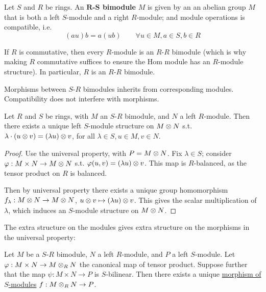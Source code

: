 \begin{definition}[Bimodule]
    Let $S$ and $R$ be rings. An \textbf{$\mathbf{R}$-$\mathbf{S}$ bimodule} $M$ is given by an an abelian group $M$ that is both a left $S$-module and a right $R$-module; and module operations is compatible, i.e.
    \[
        (au)b = a(ub) \qquad \forall u \in M, a \in S, b \in R
    \]
\end{definition}

\begin{remark}
    If $R$ is commutative, then every $R$-module is an $R$-$R$ bimodule (which is why making $R$ commutative suffices to ensure the Hom module has an $R$-module structure). In particular, $R$ is an $R$-$R$ bimodule.
\end{remark}

\begin{remark}
    Morphisms between $S$-$R$ bimodules inherits from corresponding modules. Compatibility does not interfere with morphisms.
\end{remark}

\begin{proposition}\label{Prop:Comp of bimodule}
    Let $R$ and $S$ be rings, with $M$ an $S$-$R$ bimodule, and $N$ a left $R$-module. Then there exists a unique left $S$-module structure on $M \otimes N$ s.t. $\lambda\cdot (u \otimes v) = (\lambda u) \otimes v$, for all $\lambda \in S, u\in M, v\in N$.
\end{proposition}

\begin{proof}
    Use the universal property, with $P = M \otimes N$. Fix $\lambda \in S$; consider $\varphi: M \times N \to M \otimes N$ s.t. $\varphi(u, v) = (\lambda u) \otimes v$. This map is $R$-balanced, as the tensor product on $R$ is balanced. 
    
    Then by universal property there exists a unique group homomorphism $f_{\lambda}: M \otimes N \to M \otimes N$, $u \otimes v \mapsto (\lambda u) \otimes v$. This gives the scalar multiplication of $\lambda$, which induces an $S$-module structure on $M \otimes N$.
\end{proof}

\begin{proposition}
    The extra structure on the modules gives extra structure on the morphisms in the universal property:

    Let $M$ be a $S$-$R$ bimodule, $N$ a left $R$-module, and $P$ a left $S$-module. Let $\varphi: M \times N \to M \otimes_R N$ the canonical map of tensor product. Suppose further that the map $\psi: M \times N \to P$ is $S$-bilinear. Then there exists a unique \underline{morphism of $S$-modules} $f: M \otimes_R N \to P$.
\end{proposition}

